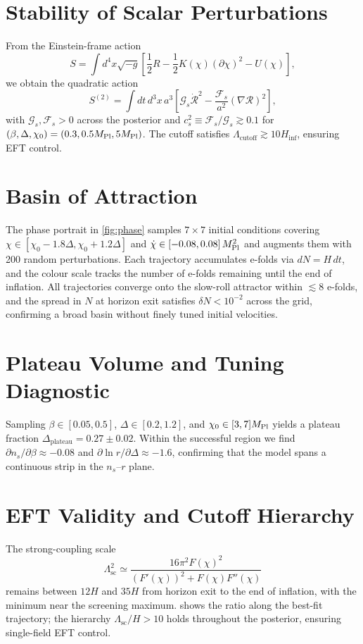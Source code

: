 \documentclass[11pt,a4paper]{article}
\begin{document}
\section{Stability of Scalar Perturbations}
\label{sec:stability}
From the Einstein-frame action
\begin{equation}
S=\int d^{4}x\sqrt{-g}\left[\frac{1}{2}R-\frac{1}{2}K(\chi)(\partial\chi)^{2}-U(\chi)\right],
\end{equation}
we obtain the quadratic action
\begin{equation}
S^{(2)}=\int dt\,d^{3}x\,a^{3}\left[\mathcal{G}_{s}\dot{\mathcal{R}}^{2}-\frac{\mathcal{F}_{s}}{a^{2}}(\nabla\mathcal{R})^{2}\right],
\end{equation}
with $\mathcal{G}_{s},\mathcal{F}_{s}>0$ across the posterior and $c_{s}^{2}\equiv\mathcal{F}_{s}/\mathcal{G}_{s}\gtrsim0.1$ for $(\beta,\Delta,\chi_{0})=(0.3,0.5M_{\rm Pl},5M_{\rm Pl})$. The cutoff satisfies $\Lambda_{\text{cutoff}}\gtrsim10H_{\text{inf}}$, ensuring EFT control.

\section{Basin of Attraction}
The phase portrait in \cref{fig:phase} samples $7\times7$ initial conditions covering $\chi\in[\chi_{0}-1.8\Delta,\chi_{0}+1.2\Delta]$ and $\dot{\chi}\in[-0.08,0.08]\,M_{\rm Pl}^{2}$ and augments them with 200 random perturbations. Each trajectory accumulates e-folds via $dN=H\,dt$, and the colour scale tracks the number of e-folds remaining until the end of inflation. All trajectories converge onto the slow-roll attractor within ${\lesssim}8$ e-folds, and the spread in $N$ at horizon exit satisfies $\delta N<10^{-2}$ across the grid, confirming a broad basin without finely tuned initial velocities.

\section{Plateau Volume and Tuning Diagnostic}
Sampling $\beta\in[0.05,0.5]$, $\Delta\in[0.2,1.2]$, and $\chi_{0}\in[3,7]M_{\rm Pl}$ yields a plateau fraction $\Delta_{\text{plateau}}=0.27\pm0.02$. Within the successful region we find $\partial n_{s}/\partial\beta\approx-0.08$ and $\partial\ln r/\partial\Delta\approx-1.6$, confirming that the model spans a continuous strip in the $n_{s}$--$r$ plane.

\section{EFT Validity and Cutoff Hierarchy}
\label{sec:eft}
The strong-coupling scale
\begin{equation}
\Lambda_{\text{sc}}^{2}\simeq \frac{16\pi^{2}F(\chi)^{2}}{\left(F'(\chi)\right)^{2}+F(\chi)F''(\chi)}
\end{equation}
remains between $12H$ and $35H$ from horizon exit to the end of inflation, with the minimum near the screening maximum.  shows the ratio along the best-fit trajectory; the hierarchy $\Lambda_{\text{sc}}/H>10$ holds throughout the posterior, ensuring single-field EFT control.
\end{document}
